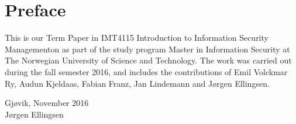 \section*{Preface}
This is our Term Paper in IMT4115 Introduction to Information Security Managementon as part of the study program Master in Information Security at The Norwegian University of Science and Technology. The work was carried out during the fall semester 2016, and includes the contributions of Emil Volckmar Ry, Audun Kjeldaas, Fabian Franz, Jan Lindemann and J{\o}rgen Ellingsen.

\begin{center}
Gj{\o}vik, November 2016\\[1pc]
Jørgen Ellingsen
\end{center}